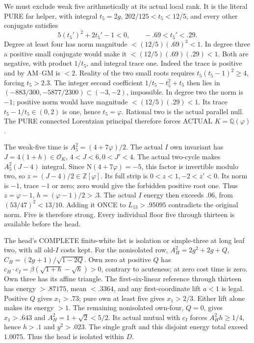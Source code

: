\documentclass[11pt]{article}
\begin{document}
We must exclude weak five arithmetically
at its actual local rank.
It is the literal PURE far helper,
with integral \(t_5=2g\),
\(202/125<t_5<12/5\), and every other
conjugate satisfies
\[
                       5(t_5')^2+2t_5'-1<0,\qquad-.69<t_5'<.29 .
\]
Degree at least four has norm magnitude
\(<(12/5)(.69)^3<1\).
In degree three a positive small conjugate
would make it \(<(12/5)(.69)(.29)<1\).
Both are negative, with product
\(1/t_5\), and integral trace one.
Indeed the trace is positive and by
AM--GM is \(<2\).
Reality of the two small roots requires
\(t_5(t_5-1)^2\ge4\), forcing \(t_5>2.3\).
The integer second coefficient
\(1/t_5-t_5^2+t_5\) then lies in
\((-883/300,-5877/2300)\subset(-3,-2)\),
impossible.
In degree two the norm is \(-1\);
positive norm would have magnitude
\(<(12/5)(.29)<1\).
Its trace \(t_5-1/t_5\in(0,2)\)
is one, hence \(t_5=\varphi\).
Rational two is the actual parallel null.
The PURE connected Lorentzian principal
therefore forces ACTUAL \(K=\mathbb Q(\varphi)\).

The weak-five time is
\(A_5^2=(4+7\varphi)/2\).
The actual \(I\) own invariant has
\(J=4(1+h)\in\mathcal O_K\),
\(4<J<6,0<J'<4\).
The actual two-cycle makes
\(A_5^2(J-4)\) integral.
Since \(\mathrm N(4+7\varphi)=-5\),
this factor is invertible modulo two,
so \(z=(J-4)/2\in\mathbb Z[\varphi]\).
Its full strip is
\(0<z<1,-2<z'<0\).
Its norm is \(-1\), trace \(-1\)
or zero; zero would give the forbidden
positive root one.
Thus \(z=\varphi-1\),
\(h=(\varphi-1)/2>.3\).
The actual \(I\) energy then exceeds
\(.06\), from \((53/47)^2<13/10\).
Adding it ONCE to \(L_{13}>.95095\)
contradicts the original norm.
Five is therefore strong.
Every individual floor five through
thirteen is available before the head.

The head's COMPLETE finite-white list
is isolation or simple-three at long
leaf two, with all old-\(I\) costs kept.
For the nonisolated row,
\(A_H^2=2g^2+2g+Q\),
\(C_H=(2g+1)/\sqrt{1-2Q}\).
Own zero at positive \(Q\) has
\(c_H\cdot c_I=\beta(\sqrt{1+h}-\sqrt h)>0\),
contrary to acuteness; at zero cost
time is zero.
Own three has its affine triangle.
The first-six-linear reference through
thirteen has energy \(>.87175\),
mean \(<.3364\), and any first-coordinate
lift \(a<1\) is legal.
Positive \(Q\) gives \(x_1>.73\);
pure own at least five gives
\(x_1>2/3\).
Either lift alone makes its energy \(>1\).
The remaining nonisolated own-four,
\(Q=0\), gives \(x_1>.643\) and
\(A_H^2=1+\sqrt2<5/2\).
Its actual mutual with \(c_I\) forces
\(A_H^2h\ge1/4\), hence \(h>.1\)
and \(y^2>.023\).
The single graft and this disjoint
energy total exceed \(1.0075\).
Thus the head is isolated within \(D\).
\end{document}
